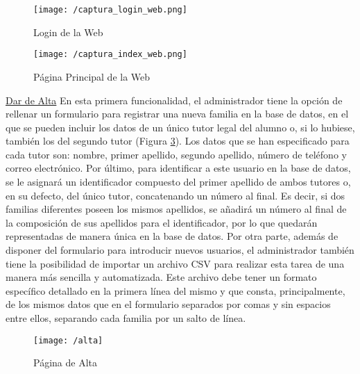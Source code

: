 \begin{figure}[!h]
	\begin{center}
		\texttt{[image: /captura\_login\_web.png]}
		\caption{Login de la Web}
		\label{fig:login_web}
	\end{center}
\end{figure}

\begin{figure}[!h]
	\begin{center}
		\texttt{[image: /captura\_index\_web.png]}
		\caption{Página Principal de la Web}
		\label{fig:index_web}
	\end{center}
\end{figure}

\newpage

\noindent \underline{Dar de Alta} \newline
En esta primera funcionalidad, el administrador tiene la opción de rellenar un formulario para registrar una nueva familia en la base de datos, en el que se pueden incluir los datos de un único tutor legal del alumno o, si lo hubiese, también los del segundo tutor (Figura \ref{fig:alta}). Los datos que se han especificado para cada tutor son: nombre, primer apellido, segundo apellido, número de teléfono y correo electrónico. Por último, para identificar a este usuario en la base de datos, se le asignará un identificador compuesto del primer apellido de ambos tutores o, en su defecto, del único tutor, concatenando un número al final. Es decir, si dos familias diferentes poseen los mismos apellidos, se añadirá un número al final de la composición de sus apellidos para el identificador, por lo que quedarán representadas de manera única en la base de datos. Por otra parte, además de disponer del formulario para introducir nuevos usuarios, el administrador también tiene la posibilidad de importar un archivo \acs{CSV} para realizar esta tarea de una manera más sencilla y automatizada. Este archivo debe tener un formato específico detallado en la primera línea del mismo y que consta, principalmente, de los mismos datos que en el formulario separados por comas y sin espacios entre ellos, separando cada familia por un salto de línea.

\clearpage

\begin{figure}[!h]
	\begin{center}
		\texttt{[image: /alta]}
		\caption{Página de Alta}
		\label{fig:alta}
	\end{center}
\end{figure}

